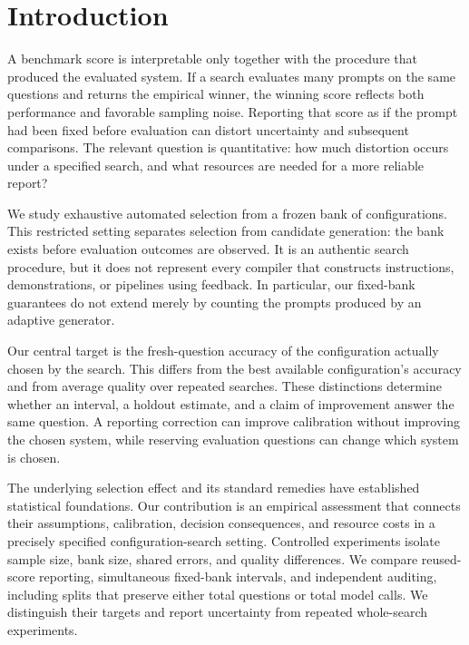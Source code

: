 \section{Introduction}
A benchmark score is interpretable only together with the procedure that produced the evaluated system. If a search evaluates many prompts on the same questions and returns the empirical winner, the winning score reflects both performance and favorable sampling noise. Reporting that score as if the prompt had been fixed before evaluation can distort uncertainty and subsequent comparisons. The relevant question is quantitative: how much distortion occurs under a specified search, and what resources are needed for a more reliable report?

We study exhaustive automated selection from a frozen bank of configurations. This restricted setting separates selection from candidate generation: the bank exists before evaluation outcomes are observed. It is an authentic search procedure, but it does not represent every compiler that constructs instructions, demonstrations, or pipelines using feedback. In particular, our fixed-bank guarantees do not extend merely by counting the prompts produced by an adaptive generator.

Our central target is the fresh-question accuracy of the configuration actually chosen by the search. This differs from the best available configuration's accuracy and from average quality over repeated searches. These distinctions determine whether an interval, a holdout estimate, and a claim of improvement answer the same question. A reporting correction can improve calibration without improving the chosen system, while reserving evaluation questions can change which system is chosen.

The underlying selection effect and its standard remedies have established statistical foundations. Our contribution is an empirical assessment that connects their assumptions, calibration, decision consequences, and resource costs in a precisely specified configuration-search setting. Controlled experiments isolate sample size, bank size, shared errors, and quality differences. We compare reused-score reporting, simultaneous fixed-bank intervals, and independent auditing, including splits that preserve either total questions or total model calls. We distinguish their targets and report uncertainty from repeated whole-search experiments.
